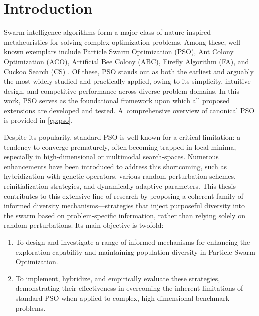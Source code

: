 
\chapter{Introduction}
\label{cp:introduction}

{



Swarm intelligence algorithms form a major class of nature-inspired \glspl{metaheuristic} for solving complex \glspl{optimization-problem}. Among these, well-known exemplars include Particle Swarm Optimization (PSO), Ant Colony Optimization (ACO), Artificial Bee Colony (ABC), Firefly Algorithm (FA), and Cuckoo Search (CS) \citep[see,][]{kennedy1995particle,dorigo1999aco,karaboga2005abc,yang2009firefly,yang2009cuckoo}. Of these, PSO stands out as both the earliest and arguably the most widely studied and practically applied, owing to its simplicity, intuitive design, and competitive performance across diverse problem domains. In this work, PSO serves as the foundational framework upon which all proposed extensions are developed and tested. A~comprehensive overview of canonical PSO is provided in \autoref{cp:pso}.

Despite its popularity, standard PSO is well-known for a critical limitation: a tendency to converge prematurely, often becoming trapped in local minima, especially in high-dimensional or multimodal \glspl{search-space}. Numerous enhancements have been introduced to address this shortcoming, such as hybridization with genetic operators, various random perturbation schemes, reinitialization strategies, and dynamically adaptive parameters. This thesis contributes to this extensive line of research by proposing a coherent family of informed diversity mechanisms---strategies that inject purposeful diversity into the swarm based on problem-specific information, rather than relying solely on random perturbations.
Its main objective is twofold:
\begin{enumerate}
\item To design and investigate a range of informed mechanisms for enhancing the exploration capability and maintaining population diversity in Particle Swarm Optimization.
\item To implement, hybridize, and empirically evaluate these strategies, demonstrating their effectiveness in overcoming the inherent limitations of standard PSO when applied to complex, high-dimensional benchmark problems.
\end{enumerate}



}
